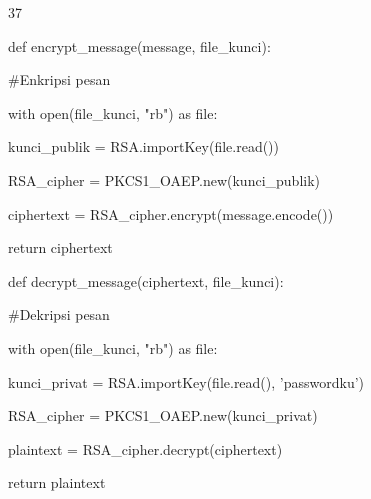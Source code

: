\documentclass{article}
\begin{document}

37

def encrypt\_message(message, file\_kunci):

    \#Enkripsi pesan

    with open(file\_kunci, "rb") as file:

         kunci\_publik = RSA.importKey(file.read())


    RSA\_cipher = PKCS1\_OAEP.new(kunci\_publik)

    ciphertext = RSA\_cipher.encrypt(message.encode())

    return ciphertext 



def decrypt\_message(ciphertext, file\_kunci):

    \#Dekripsi pesan

    with open(file\_kunci, "rb") as file:

         kunci\_privat = RSA.importKey(file.read(), 'passwordku')


    RSA\_cipher = PKCS1\_OAEP.new(kunci\_privat)

    plaintext = RSA\_cipher.decrypt(ciphertext)

    return plaintext
\end{document}
